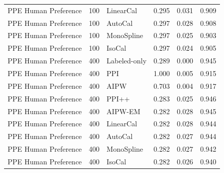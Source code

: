 \begin{tabular}{lllccc}
PPE Human Preference & 100 & LinearCal & 0.295 & 0.031 & 0.909 \\
PPE Human Preference & 100 & AutoCal & 0.297 & 0.028 & 0.908 \\
PPE Human Preference & 100 & MonoSpline & 0.297 & 0.025 & 0.903 \\
PPE Human Preference & 100 & IsoCal & 0.297 & 0.024 & 0.905 \\
PPE Human Preference & 400 & Labeled-only & 0.289 & 0.000 & 0.945 \\
PPE Human Preference & 400 & PPI & 1.000 & 0.005 & 0.915 \\
PPE Human Preference & 400 & AIPW & 0.703 & 0.004 & 0.917 \\
PPE Human Preference & 400 & PPI++ & 0.283 & 0.025 & 0.946 \\
PPE Human Preference & 400 & AIPW-EM & 0.282 & 0.028 & 0.945 \\
PPE Human Preference & 400 & LinearCal & 0.282 & 0.028 & 0.944 \\
PPE Human Preference & 400 & AutoCal & 0.282 & 0.027 & 0.944 \\
PPE Human Preference & 400 & MonoSpline & 0.282 & 0.027 & 0.942 \\
PPE Human Preference & 400 & IsoCal & 0.282 & 0.026 & 0.940 \\
\bottomrule
\end{tabular}
